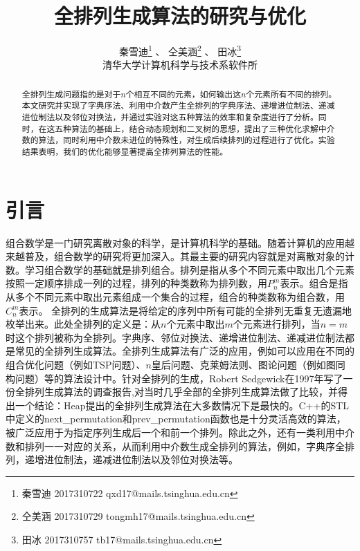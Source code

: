 \documentclass[10pt, twocolumn]{ctexart}
\begin{document}
\title{全排列生成算法的研究与优化}
\author{秦雪迪\footnote{秦雪迪 2017310722 qxd17@mails.tsinghua.edu.cn } 、 仝美涵\footnote{仝美涵 2017310729  tongmh17@mails.tsinghua.edu.cn} 、
田冰\footnote{田冰 2017310757 tb17@mails.tsinghua.edu.cn}  \\ 清华大学计算机科学与技术系软件所}
\date{}
\maketitle

\begin{abstract}全排列生成问题指的是对于$n$个相互不同的元素，如何输出这$n$个元素所有不同的排列。本文研究并实现了字典序法、利用中介数产生全排列的字典序法、递增进位制法、递减进位制法以及邻位对换法，并通过实验对这五种算法的效率和复杂度进行了分析。同时，在这五种算法的基础上，结合动态规划和二叉树的思想，提出了三种优化求解中介数的算法，同时利用中介数未进位的特殊性，对生成后续排列的过程进行了优化。实验结果表明，我们的优化能够显著提高全排列算法的性能。 
\end{abstract}

\section{引言}组合数学是一门研究离散对象的科学，是计算机科学的基础。随着计算机的应用越来越普及，组合数学的研究将更加深入。其最主要的研究内容就是对离散对象的计数\cite{卢开澄2006组合数学}。学习组合数学的基础就是排列组合。排列是指从多个不同元素中取出几个元素按照一定顺序排成一列的过程，排列的种类数称为排列数，用$P_{n}^m$表示。组合是指从多个不同元素中取出元素组成一个集合的过程，组合的种类数称为组合数，用$C_n^m$表示。
全排列的生成算法是将给定的序列中所有可能的全排列无重复无遗漏地枚举出来。此处全排列的定义是：从$n$个元素中取出$m$个元素进行排列，当$n=m$时这个排列被称为全排列。字典序、邻位对换法、递增进位制法、递减进位制法都是常见的全排列生成算法。全排列生成算法有广泛的应用，例如可以应用在不同的组合优化问题（例如TSP问题）、$n$皇后问题、克莱姆法则\cite{李模刚2010全排列生成算法在克莱姆法则中的应用}、图论问题（例如图同构问题）等的算法设计中\cite{Maccallum1977Surveyor}。针对全排列的生成，Robert Sedgewick在1997年写了一份全排列生成算法的调查报告\cite{Sedgewick1977Permutation},对当时几乎全部的全排列生成算法做了比较，并得出一个结论：Heap提出的全排列生成算法在大多数情况下是最快的。C++的STL中定义的next\_permutation和prev\_permutation函数也是十分灵活高效的算法，被广泛应用于为指定序列生成后一个和前一个排列。除此之外，还有一类利用中介数和排列一一对应的关系，从而利用中介数生成全排列的算法，例如，字典序全排列，递增进位制法，递减进位制法以及邻位对换法等。
\end{document}
